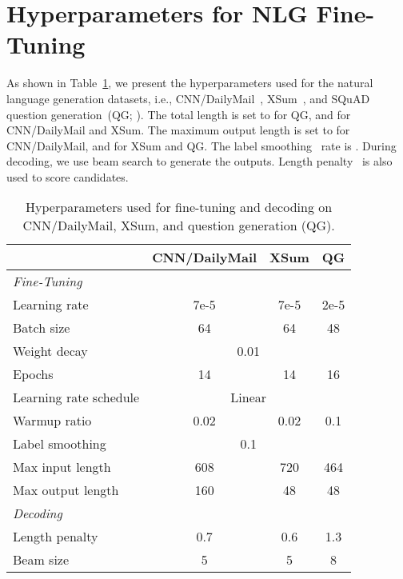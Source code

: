 \documentclass{article}
\begin{document}
\section{Hyperparameters for NLG Fine-Tuning}

As shown in Table~\ref{tbl:nlg_finetune_hyperparams}, we present the hyperparameters used for the natural language generation datasets, i.e., CNN/DailyMail~\cite{see-2017-get}, XSum~\cite{xsum}, and SQuAD question generation~(QG; \citealt{du-qg-2018,zhao-qg-2018}).
The total length is set to  for QG, and  for CNN/DailyMail and XSum.
The maximum output length is set to  for CNN/DailyMail, and  for XSum and QG.
The label smoothing~\cite{label:smoothing} rate is .
During decoding, we use beam search to generate the outputs.
Length penalty~\cite{gnmt} is also used to score candidates.


\begin{table}[h]
\centering
\small
\begin{tabular}{lccc}
\toprule
 & \bf CNN/DailyMail & \bf XSum & \bf QG \\
\midrule
\multicolumn{4}{l}{\emph{Fine-Tuning}} \\
Learning rate & 7e-5 & 7e-5 & 2e-5 \\
Batch size & 64 & 64 & 48 \\
Weight decay & \multicolumn{3}{c}{0.01} \\
Epochs & 14 & 14 & 16 \\
Learning rate schedule & \multicolumn{3}{c}{Linear} \\
Warmup ratio & 0.02 & 0.02 & 0.1 \\
Label smoothing & \multicolumn{3}{c}{0.1} \\
Max input length & 608 & 720 & 464 \\
Max output length & 160 & 48 & 48 \\
\midrule
\multicolumn{4}{l}{\emph{Decoding}} \\
Length penalty & 0.7 & 0.6 & 1.3 \\
Beam size & 5 & 5 & 8 \\
\bottomrule
\end{tabular}
\caption{
Hyperparameters used for fine-tuning and decoding on CNN/DailyMail, XSum, and question generation (QG).
}
\label{tbl:nlg_finetune_hyperparams}
\end{table}
\end{document}
